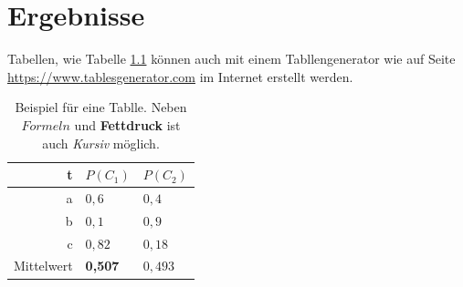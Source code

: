 \chapter{Ergebnisse} %
\label{chap:ergebnisse}

Tabellen, wie Tabelle \ref{tab:example} können auch mit einem Tabllengenerator wie auf Seite \url{https://www.tablesgenerator.com} im Internet erstellt werden.
\begin{table}[h]
    \centering
    \begin{tabular}{|r||l|l|}\hline
        t & $P(C_1)$ & $P(C_2)$\\\hline
        a & $0,6$ & $0,4$\\\hline
        b & $0,1$ & $0,9$\\\hline
        c & $0,82$ & $0,18$\\\hline\hline
        Mittelwert & \textbf{0,507} & $0,493$\\\hline
    \end{tabular}
    \caption{Beispiel für eine Tablle. Neben $Formeln$ und \textbf{Fettdruck} ist auch \textit{Kursiv} möglich.}
    \label{tab:example}
\end{table} 
